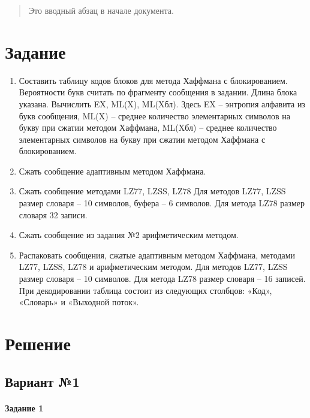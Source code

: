 \documentclass[a4paper, 12pt]{article}
\begin{document}
 
\tableofcontents

\begin{abstract}
  Это вводный абзац в начале документа.
\end{abstract}
 
\section{Задание}
\begin{enumerate}
\item Составить таблицу кодов блоков для метода Хаффмана с блокированием. Вероятности букв считать по фрагменту сообщения в задании. Длина блока указана. Вычислить EX, ML(X), ML(Xбл). Здесь EX – энтропия алфавита из букв сообщения, ML(X) – среднее количество элементарных символов на букву при сжатии методом Хаффмана, ML(Xбл) – среднее количество элементарных символов на букву при сжатии методом Хаффмана с блокированием. 
\item Сжать сообщение адаптивным методом Хаффмана. 
\item Сжать сообщение методами LZ77, LZSS, LZ78  Для методов LZ77, LZSS размер словаря – 10 символов, буфера – 6 символов. Для метода LZ78 размер словаря 32 записи. 
\item Сжать сообщение из задания №2 арифметическим методом. 
\item Распаковать сообщения, сжатые адаптивным методом Хаффмана, методами LZ77, LZSS, LZ78 и арифметическим методом. Для методов LZ77, LZSS размер словаря – 10 символов. Для метода LZ78 размер словаря – 16 записей. При декодировании таблица состоит из следующих столбцов: «Код», «Словарь» и «Выходной поток».
\end{enumerate}
\pagebreak
\section{Решение}
\subsection{Вариант №1}
\paragraph{Задание 1}
\end{document}
